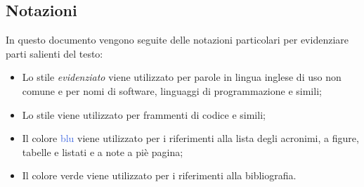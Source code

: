 \subsection{Notazioni}
In questo documento vengono seguite delle notazioni particolari per evidenziare parti salienti del testo:
\begin{itemize}
\item Lo stile \emph{evidenziato} viene utilizzato per parole in lingua inglese di uso non comune e per nomi di software, linguaggi di programmazione e simili;
\item Lo stile  viene utilizzato per frammenti di codice e simili;
\item Il colore \textcolor{RoyalBlue}{blu} viene utilizzato per i riferimenti alla lista degli acronimi, a figure, tabelle e listati e a note a piè pagina;
\item Il colore \textcolor{webgreen}{verde} viene utilizzato per i riferimenti alla bibliografia.
\end{itemize}